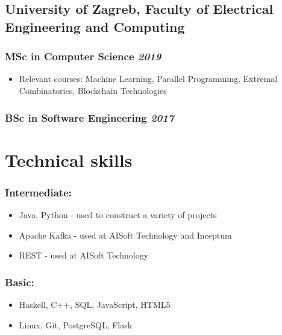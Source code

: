 \documentclass[a4paper]{article}
\newcommand{\bolditalicpair}
[2]
{\textbf{#1} \texorpdfstring{\hfill}{} \textit{#2}}
\begin{document}
\subsection{\bolditalicpair{University of Zagreb, Faculty of Electrical Engineering and Computing}{}}

\subsubsection{\bolditalicpair{MSc in Computer Science}{2019}}

\begin{itemize}
  \item Relevant courses: Machine Learning, Parallel Programming, Extremal Combinatorics, Blockchain Technologies %
\end{itemize}

\subsubsection{\bolditalicpair{BSc in Software Engineering}{2017}}



\section{Technical skills}
\subsubsection{\bolditalicpair{Intermediate:}{}}

\begin{itemize}
  \item Java, Python - used to construct a variety of projects
  \item Apache Kafka - used at AISoft Technology and Inceptum
  \item REST - used at AISoft Technology
\end{itemize}

\subsubsection{\bolditalicpair{Basic:}{}}

\begin{itemize}
  \item Haskell, C++, SQL, JavaScript, HTML5
  \item Linux, Git, PostgreSQL, Flask
\end{itemize}
\end{document}
